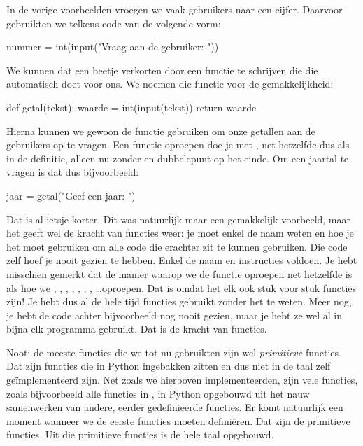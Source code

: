   In de vorige voorbeelden vroegen we vaak gebruikers naar een cijfer.
  Daarvoor gebruikten we telkens code van de volgende vorm:
  \begin{python}
    nummer = int(input("Vraag aan de gebruiker: "))
  \end{python}
  We kunnen dat een beetje verkorten door een functie te schrijven die die
   automatisch doet voor ons. We noemen die functie
   voor de gemakkelijkheid:
  \begin{python}
    def getal(tekst):
      waarde = int(input(tekst))
      return waarde
  \end{python}
  Hierna kunnen we gewoon de functie  gebruiken om onze getallen aan
  de gebruikers op te vragen. Een functie oproepen doe je met
  , net hetzelfde dus als in de definitie,
  alleen nu zonder  en dubbelepunt op het einde. Om een jaartal te
  vragen is dat dus bijvoorbeeld:
  \begin{python}
    jaar = getal("Geef een jaar: ")
  \end{python}
  Dat is al ietsje korter. Dit was natuurlijk maar een gemakkelijk voorbeeld,
  maar het geeft wel de kracht van functies weer: je moet enkel de naam weten en
  hoe je het moet gebruiken om alle code die erachter zit te kunnen gebruiken.
  Die code zelf hoef je nooit gezien te hebben. Enkel de naam en instructies
  voldoen. Je hebt misschien gemerkt dat de manier waarop we de functie
   oproepen net hetzelfde is als hoe we , ,
  , , , , , \ldots oproepen. Dat
  is omdat het elk ook stuk voor stuk functies zijn! Je hebt dus al de hele tijd
  functies gebruikt zonder het te weten. Meer nog, je hebt de code achter
  bijvoorbeeld  nog nooit gezien, maar je hebt ze wel al in bijna elk
  programma gebruikt. Dat is de kracht van functies.

  Noot: de meeste functies die we tot nu gebruikten zijn wel \emph{primitieve}
  functies. Dat zijn functies die in Python ingebakken zitten en dus niet in de
  taal zelf ge\"implementeerd zijn.
  Net zoals we hierboven  implementeerden, zijn vele
  functies, zoals bijvoorbeeld alle functies in , in Python opgebouwd
  uit het nauw samenwerken van andere, eerder gedefinieerde functies. Er komt
  natuurlijk een moment wanneer we de eerste functies moeten defini\"eren. Dat
  zijn de primitieve functies. Uit die primitieve functies is de hele taal
  opgebouwd.

